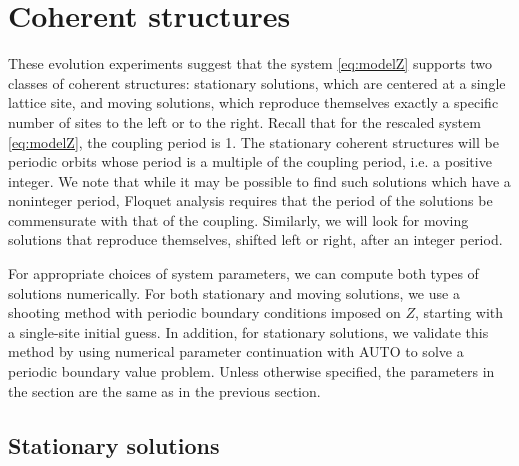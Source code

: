 \documentclass[reprint, amsmath,amssymb,aps,pre]{revtex4-2}
\begin{document}
\section{Coherent structures}

These evolution experiments suggest that the system \cref{eq:modelZ} supports two classes of coherent structures: stationary solutions, which are centered at a single lattice site, and moving solutions, which reproduce themselves exactly a specific number of sites to the left or to the right. Recall that for the rescaled system \cref{eq:modelZ}, the coupling period is 1. The stationary coherent structures will be periodic orbits whose period is a multiple of the coupling period, i.e. a positive integer. We note that while it may be possible to find such solutions which have a noninteger period, Floquet analysis requires that the period of the solutions be commensurate with that of the coupling. Similarly, we will look for moving solutions that reproduce themselves, shifted left or right, after an integer period.

For appropriate choices of system parameters, we can compute both types of solutions numerically. For both stationary and moving solutions, we use a shooting method with periodic boundary conditions imposed on $Z$, starting with a single-site initial guess. In addition, for stationary solutions, we validate this method by using numerical parameter continuation with AUTO \cite{auto07p} to solve a periodic boundary value problem. Unless otherwise specified, the parameters in the section are the same as in the previous section. 

\subsection{Stationary solutions}
\end{document}
